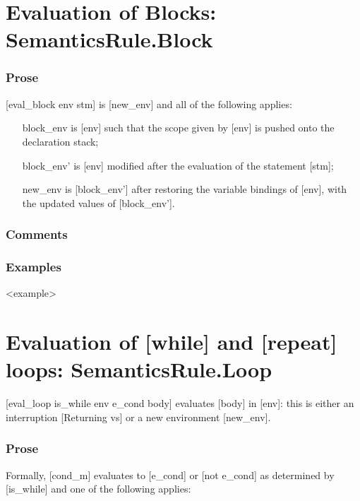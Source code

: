 \documentclass{book}
\begin{document}
\section{Evaluation of Blocks: SemanticsRule.Block \label{sec:SemanticsRule.Block}}

    \subsubsection{Prose}
    [eval\_block env stm] is [new\_env] and all of the following applies:
    \begin{itemize}
    \item [block\_env] is [env] such that the scope given by [env] is pushed onto the
      declaration stack;
    \item [block\_env'] is [env] modified after the evaluation of the statement [stm];
    \item [new\_env] is [block\_env'] after restoring the variable bindings of [env],
    with the updated values of [block\_env'].
    \end{itemize}
 
    \subsubsection{Comments}

    \subsubsection{Examples}
    <example>

\section{Evaluation of [while] and [repeat] loops: SemanticsRule.Loop \label{sec:SemanticsRule.Loop}}
[eval\_loop is\_while env e\_cond body] evaluates [body] in [env]: this is either
an interruption [Returning vs] or a new environment [new\_env].

    \subsubsection{Prose}
    Formally, [cond\_m] evaluates to [e\_cond] or [not e\_cond] as determined by
    [is\_while] and one of the following applies:
\end{document}
